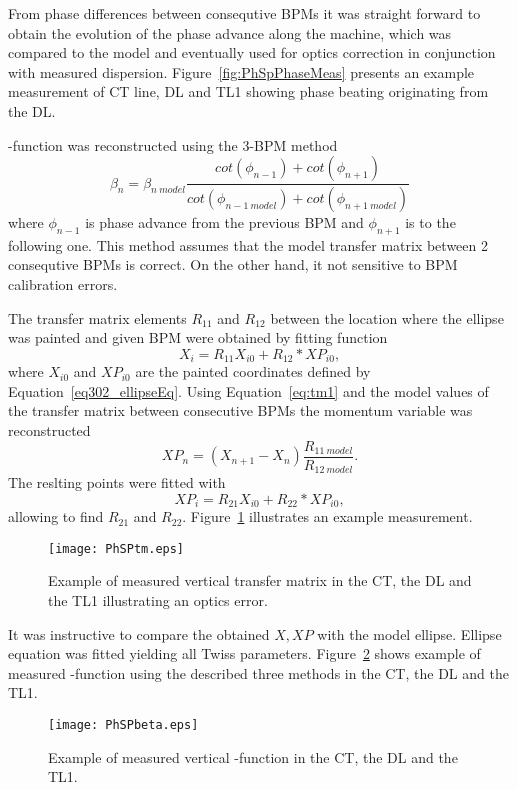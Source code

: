 From phase differences between consequtive BPMs it was straight forward to obtain
the evolution of the phase advance along the machine, which was compared to the model
and eventually used for optics correction in conjunction with measured dispersion.
Figure~\ref{fig:PhSpPhaseMeas} presents an example measurement of CT line, DL and TL1
showing phase beating originating from the DL.

\textbeta -function was reconstructed using the 3-BPM method~\cite{bib:3BPMmethod}
\begin{equation}
\beta_{n} = \beta_{n~model}\frac{cot(\phi_{n-1}) + cot(\phi_{n+1}) }{cot(\phi_{n-1~model}) + cot(\phi_{n+1~model})}
\end{equation}
where $\phi_{n-1}$ is phase advance from the previous BPM and $\phi_{n+1}$ is to the following one.
This method assumes that the model transfer matrix between 2 consequtive BPMs is correct.
On the other hand, it not sensitive to BPM calibration errors.

The transfer matrix elements $R_{11}$ and $R_{12}$ between the location where the ellipse was painted
and given BPM were obtained by fitting function 
\begin{equation}
X_i = R_{11}X_{i0} + R_{12}*XP_{i0},
\label{eq:tm1}
\end{equation}
where $X_{i0}$ and $XP_{i0}$ are the painted coordinates defined by Equation~\ref{eq302_ellipseEq}.
Using Equation~\ref{eq:tm1} and the model values of the transfer matrix between consecutive
BPMs the momentum variable was reconstructed
\begin{equation}
XP_{n} = (X_{n+1} - X_{n})\frac{R_{11~model}}{R_{12~model}}.
\end{equation}
The reslting points were fitted with 
\begin{equation}
XP_i = R_{21}X_{i0} + R_{22}*XP_{i0},
\label{eq:tm2}
\end{equation}
allowing to find $R_{21}$ and $R_{22}$. Figure~\ref{fig:PhSpTM} illustrates an example measurement.

\begin{figure}[!h]
 \begin{center}
   \texttt{[image: PhSPtm.eps]} 
 \end{center}
 \caption{Example of measured vertical transfer matrix in 
          the CT, the DL and the TL1 illustrating an optics error.}
 \label{fig:PhSpTM}
\end{figure}


It was instructive to compare the obtained $X,XP$ with the model ellipse.
Ellipse equation was fitted yielding all Twiss parameters. 
Figure~\ref{fig:PhSpBeta} shows example of measured \textbeta -function 
using the described three methods in the CT, the DL and the TL1.

\begin{figure}[!h]
 \begin{center}
   \texttt{[image: PhSPbeta.eps]} 
 \end{center}
 \caption{Example of measured vertical \textbeta -function in the CT, the DL and the TL1.}
 \label{fig:PhSpBeta}
\end{figure}




 
